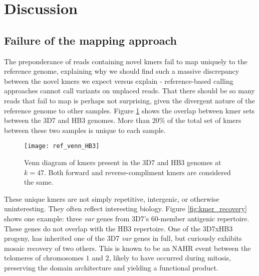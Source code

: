 
\section{Discussion}
\subsection{Failure of the mapping approach}

The preponderance of reads containing novel kmers fail to map uniquely to the reference genome, explaining why we should find such a massive discrepancy between the novel kmers we expect versus explain - reference-based calling approaches cannot call variants on unplaced reads.  That there should be so many reads that fail to map is perhaps not surprising, given the divergent nature of the reference genome to other samples.  Figure \ref{fig:ref_venn_HB3} shows the overlap between kmer sets between the 3D7 and HB3 genomes.  More than $20\%$ of the total set of kmers between these two samples is unique to each sample.

\begin{figure}[h!]
  \centering
    \texttt{[image: ref\_venn\_HB3]}
  \caption{Venn diagram of kmers present in the 3D7 and HB3 genomes at $k=47$.  Both forward and reverse-compliment kmers are considered the same.}
  \label{fig:ref_venn_HB3}
\end{figure}

These unique kmers are not simply repetitive, intergenic, or otherwise uninteresting.  They often reflect interesting biology.  Figure \ref{fig:kmer_recovery} shows one example: three \textit{var} genes from 3D7's $60$-member antigenic repertoire.  These genes do not overlap with the HB3 repertoire.  One of the 3D7xHB3 progeny, has inherited one of the 3D7 \textit{var} genes in full, but curiously exhibits mosaic recovery of two others.  This is known to be an NAHR event between the telomeres of chromosomes $1$ and $2$, likely to have occurred during mitosis, preserving the domain architecture and yielding a functional product\cite{Claessens:2014fo}.


